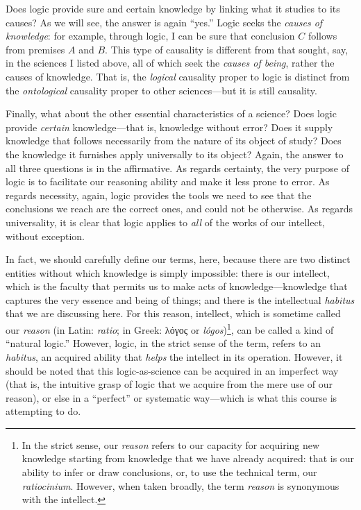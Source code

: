 \documentclass[article,12pt,a4paper,oneside]{memoir}
\begin{document}
    Does logic provide sure and certain knowledge by linking what it
    studies to its causes? As we will see, the answer is again ``yes.''
    Logic seeks the \emph{causes of knowledge}: for example, through
    logic, I can be sure that conclusion \(C\) follows from premises
    \(A\) and \(B\). This type of causality is different from that
    sought, say, in the sciences I listed above, all of which seek the
    \emph{causes of being}, rather the causes of knowledge. That is, the
    \emph{logical} causality proper to logic is distinct from the
    \emph{ontological} causality proper to other sciences---but it is
    still causality.

    Finally, what about the other essential characteristics of a
    science? Does logic provide \emph{certain} knowledge---that is,
    knowledge without error? Does it supply knowledge that follows
    necessarily from the nature of its object of study? Does the
    knowledge it furnishes apply universally to its object? Again, the
    answer to all three questions is in the affirmative. As regards
    certainty, the very purpose of logic is to facilitate our reasoning
    ability and make it less prone to error. As regards necessity,
    again, logic provides the tools we need to see that the conclusions
    we reach are the correct ones, and could not be otherwise. As
    regards universality, it is clear that logic applies to \emph{all}
    of the works of our intellect, without exception.

    In fact, we should carefully define our terms, here, because there
    are two distinct entities without which knowledge is simply
    impossible: there is our intellect, which is the faculty that
    permits us to make acts of knowledge---knowledge that captures the
    very essence and being of things; and there is the intellectual
    \emph{habitus} that we are discussing here. For this reason,
    intellect, which is sometime called our \emph{reason} (in Latin:
    \emph{ratio}; in Greek: λόγος or \emph{lógos})\footnote{In the
      strict sense, our \emph{reason} refers to our capacity for
      acquiring new knowledge starting from knowledge that we have
      already acquired: that is our ability to infer or draw
      conclusions, or, to use the technical term, our
      \emph{ratiocinium}. However, when taken broadly, the term
      \emph{reason} is synonymous with the intellect.}, can be called a
    kind of ``natural logic.'' However, logic, in the strict sense of
    the term, refers to an \emph{habitus}, an acquired ability that
    \emph{helps} the intellect in its operation. However, it should be
    noted that this logic-as-science can be acquired in an imperfect way
    (that is, the intuitive grasp of logic that we acquire from the mere
    use of our reason), or else in a ``perfect'' or systematic
    way---which is what this course is attempting to do.
\end{document}
